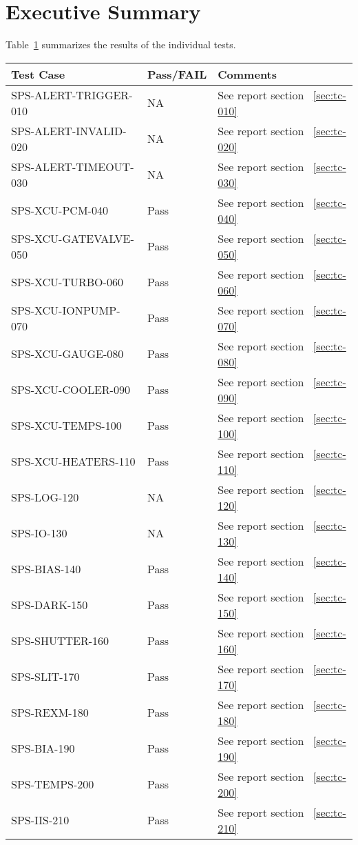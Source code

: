 \section{Executive Summary}

Table~\ref{tab:summary-table} summarizes the results of the individual tests.

\begin{table}[H]
    \begin{tabular}{|p{6cm}|l| p{7cm} | }
    \hline
    {\bf Test Case} & {\bf Pass/FAIL} & {\bf Comments} \\ \hline
    SPS-ALERT-TRIGGER-010 & NA & See report section ~\ref{sec:tc-010} \\ \hline
    SPS-ALERT-INVALID-020 & NA & See report section ~\ref{sec:tc-020} \\ \hline
    SPS-ALERT-TIMEOUT-030 & NA & See report section ~\ref{sec:tc-030} \\ \hline
    SPS-XCU-PCM-040 & Pass & See report section ~\ref{sec:tc-040} \\ \hline
    SPS-XCU-GATEVALVE-050 & Pass & See report section ~\ref{sec:tc-050} \\ \hline
    SPS-XCU-TURBO-060 & Pass & See report section ~\ref{sec:tc-060} \\ \hline
    SPS-XCU-IONPUMP-070 & Pass & See report section ~\ref{sec:tc-070} \\ \hline
    SPS-XCU-GAUGE-080 & Pass & See report section ~\ref{sec:tc-080} \\ \hline
    SPS-XCU-COOLER-090 & Pass & See report section ~\ref{sec:tc-090} \\ \hline
    SPS-XCU-TEMPS-100 & Pass & See report section ~\ref{sec:tc-100} \\ \hline
    SPS-XCU-HEATERS-110 & Pass & See report section ~\ref{sec:tc-110} \\ \hline
    SPS-LOG-120 & NA & See report section ~\ref{sec:tc-120} \\ \hline
    SPS-IO-130 & NA & See report section ~\ref{sec:tc-130} \\ \hline
    SPS-BIAS-140 & Pass & See report section ~\ref{sec:tc-140} \\ \hline
    SPS-DARK-150 & Pass & See report section ~\ref{sec:tc-150} \\ \hline
    SPS-SHUTTER-160 & Pass & See report section ~\ref{sec:tc-160} \\ \hline
    SPS-SLIT-170 & Pass & See report section ~\ref{sec:tc-170} \\ \hline
    SPS-REXM-180 & Pass & See report section ~\ref{sec:tc-180} \\ \hline
    SPS-BIA-190 & Pass & See report section ~\ref{sec:tc-190} \\ \hline
    SPS-TEMPS-200 & Pass & See report section ~\ref{sec:tc-200} \\ \hline
    SPS-IIS-210 & Pass & See report section ~\ref{sec:tc-210} \\ \hline

    \end{tabular}
\label{tab:summary-table}
\end{table}


